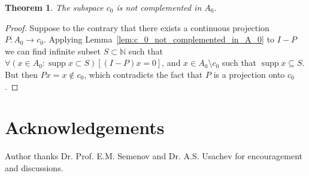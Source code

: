 \documentclass[a4paper,10pt]{article} %
\DeclareMathOperator{\supp}{supp}
\theoremstyle{plain}
\newtheorem{theorem}{Theorem}[section]
\theoremstyle{definition}
\begin{document}
\begin{theorem}
	The subspace $c_0$ is not complemented in $A_0$.
\end{theorem}

\begin{proof}
	Suppose to the contrary that
	there exists a continuous projection $P: A_0 \to c_0$.
	Applying Lemma~\ref{lem:c_0_not_complemented_in_A_0} to $I-P$
	we can find infinite subset $S\subset\mathbb{N}$
	such that $\forall(x\in A_0 : \supp x \subset S)[(I-P)x = 0]$,
	and $x\in A_0 \setminus c_0$ such that $\supp x \subseteq S$.
	But then $Px = x\notin c_0$,
	which contradicts  the fact  that $P$ is a projection onto $c_0$.
\end{proof}


\section{Acknowledgements}
Author thanks Dr. Prof. E.M. Semenov and Dr. A.S. Usachev for encouragement and discussions.


\end{document}
